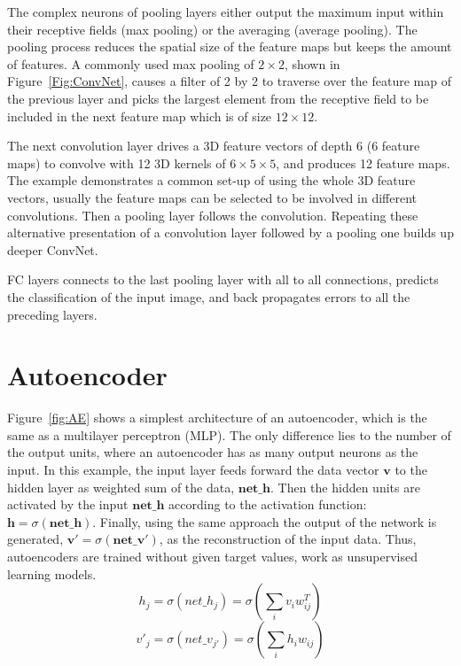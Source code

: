 The complex neurons of pooling layers either output the maximum input within their receptive fields (max pooling) or the averaging (average pooling).
The pooling process reduces the spatial size of the feature maps but keeps the amount of features.
A commonly used max pooling of $2\times2$, shown in Figure~\ref{Fig:ConvNet}, causes a filter of 2 by 2 to traverse over the feature map of the previous layer and picks the largest element from the receptive field to be included in the next feature map which is of size $12\times12$.

The next convolution layer drives a 3D feature vectors of depth 6 (6 feature maps) to convolve with 12 3D kernels of $6\times5\times5$, and produces 12 feature maps.
The example demonstrates a common set-up of using the whole 3D feature vectors, usually the feature maps can be selected to be involved in different convolutions.
Then a pooling layer follows the convolution.
Repeating these alternative presentation of a convolution layer followed by a pooling one builds up deeper ConvNet.

FC layers connects to the last pooling layer with all to all connections, predicts the classification of the input image, and back propagates errors to all the preceding layers.
 




\section{Autoencoder}
\label{sec:AE}
Figure~\ref{fig:AE} shows a simplest architecture of an autoencoder, which is the same as a multilayer perceptron (MLP).
The only difference lies to the number of the output units, where an autoencoder has as many output neurons as the input.
In this example, the input layer feeds forward the data vector $\mathbf{v}$ to the hidden layer as weighted sum of the data, $\mathbf{net\_h}$.
Then the hidden units are activated by the input $\mathbf{net\_h}$ according to the activation function: $\mathbf{h}=\sigma(\mathbf{net\_h})$.
Finally, using the same approach the output of the network is generated, $\mathbf{v'}=\sigma(\mathbf{net\_v'})$, as the reconstruction of the input data.
Thus, autoencoders are trained without given target values, work as unsupervised learning models.
\begin{equation}
h_j=\sigma(net\_h_j)=\sigma(\sum_i v_i w^T_{ij})
\end{equation}
\begin{equation}
v'_j=\sigma(net\_v_{j'})=\sigma(\sum_i h_i w_{ij})
\end{equation}

